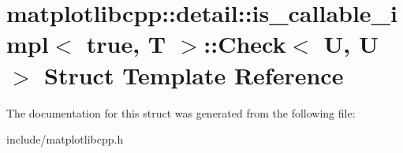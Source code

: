 \hypertarget{structmatplotlibcpp_1_1detail_1_1is__callable__impl_3_01true_00_01T_01_4_1_1Check}{}\section{matplotlibcpp\+:\+:detail\+:\+:is\+\_\+callable\+\_\+impl$<$ true, T $>$\+:\+:Check$<$ U, U $>$ Struct Template Reference}
\label{structmatplotlibcpp_1_1detail_1_1is__callable__impl_3_01true_00_01T_01_4_1_1Check}


The documentation for this struct was generated from the following file\+:\begin{DoxyCompactItemize}
\item 
include/matplotlibcpp.\+h\end{DoxyCompactItemize}
